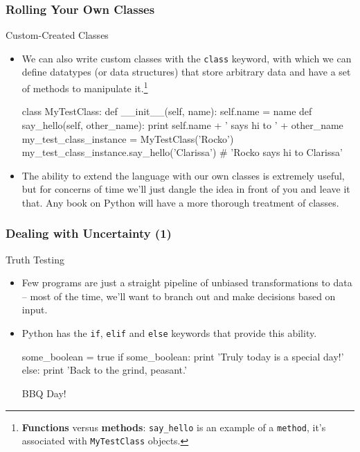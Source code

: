 \documentclass[10pt]{beamer}
\begin{document}
\begin{frame}[fragile]
  \frametitle{Rolling Your Own Classes}
  \begin{block}{Custom-Created Classes}
    \begin{itemize}
      \item We can also write custom classes with the \texttt{class} keyword, with which we can define datatypes (or data structures) that store arbitrary data and have a set of methods to manipulate it.\footnote{\textbf{Functions} versus \textbf{methods}: \texttt{say\_hello} is an example of a \texttt{method}, it's associated with \texttt{MyTestClass} objects.}
        \footnotesize
        \begin{pythoncode}
  class MyTestClass:
    def __init__(self, name):
      self.name = name
    def say_hello(self, other_name):
      print self.name + ' says hi to ' + other_name
  my_test_class_instance = MyTestClass('Rocko')
  my_test_class_instance.say_hello('Clarissa')
  # 'Rocko says hi to Clarissa'
        \end{pythoncode}
      \normalsize
      \item The ability to extend the language with our own classes is extremely useful, but for concerns of time we'll just dangle the idea in front of you and leave it that.
        Any book on Python will have a more thorough treatment of classes.
    \end{itemize}
  \end{block}
\end{frame}
      

\begin{frame}[fragile]
  \frametitle{Dealing with Uncertainty (1)}
  \begin{block}{Truth Testing}
    \begin{itemize}
      \item Few programs are just a straight pipeline of unbiased transformations to data -- most of the time, we'll want to branch out and make decisions based on input.
      \item Python has the \texttt{if}, \texttt{elif} and \texttt{else} keywords that provide this ability.
        \begin{pythoncode}
  some_boolean = true
  if some_boolean:
    print 'Truly today is a special day!'
  else:
    print 'Back to the grind, peasant.'
        \end{pythoncode}
      BBQ Day!
    \end{itemize}
  \end{block}
\end{frame}
      
\end{document}
